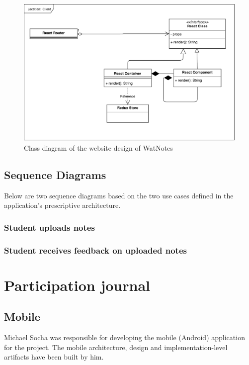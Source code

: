 \documentclass[12pt]{article}
\begin{document}
  \begin{figure}[H]
    \centering
    \includegraphics[width=\textwidth]{assets/frontend_design.pdf}
    \caption{Class diagram of the website design of WatNotes}
  \end{figure}

  \subsection{Sequence Diagrams}
    Below are two sequence diagrams based on the two use cases defined in the application's prescriptive architecture.

    \subsubsection{Student uploads notes}

    \subsubsection{Student receives feedback on uploaded notes}

  \newpage

  \section{Participation journal}
    \subsection{Mobile}
      Michael Socha was responsible for developing the mobile (Android) application for the project. The mobile architecture, design and implementation-level artifacts
      have been built by him.
\end{document}
